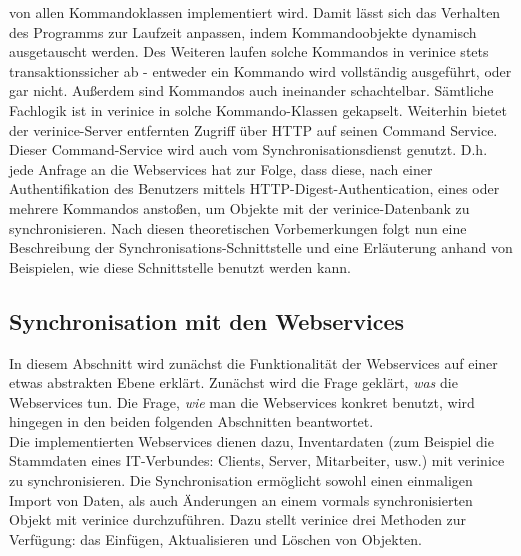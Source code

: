 \documentclass[a4paper,10pt]{book}
\begin{document}
von allen Kommandoklassen implementiert wird. Damit lässt sich das Verhalten des Programms zur
Laufzeit anpassen, indem Kommandoobjekte dynamisch ausgetauscht werden.
\newline
Des Weiteren laufen solche Kommandos in verinice stets transaktionssicher ab - entweder ein Kommando
wird vollständig ausgeführt, oder gar nicht. Außerdem sind Kommandos auch ineinander schachtelbar.
Sämtliche Fachlogik ist in verinice in solche Kommando-Klassen gekapselt. Weiterhin bietet der
verinice-Server entfernten Zugriff über HTTP auf seinen Command Service.
\newline
Dieser Command-Service wird auch vom Synchronisationsdienst genutzt. D.h. jede Anfrage an die Webservices hat zur Folge,
dass diese, nach einer Authentifikation des Benutzers mittels HTTP-Digest-Authentication, eines oder mehrere Kommandos anstoßen,
um Objekte mit der verinice-Datenbank zu synchronisieren.
\newline
Nach diesen theoretischen Vorbemerkungen folgt nun eine Beschreibung der Synchronisations-Schnittstelle
und eine Erläuterung anhand von Beispielen, wie diese Schnittstelle benutzt werden kann.

\subsection{Synchronisation mit den Webservices}
In diesem Abschnitt wird zunächst die Funktionalität der Webservices auf einer etwas abstrakten Ebene
erklärt. Zunächst wird die Frage geklärt, \textit{was} die Webservices tun. Die Frage, \textit{wie}
man die Webservices konkret benutzt, wird hingegen in den beiden folgenden Abschnitten beantwortet.
\newline\\
Die implementierten Webservices dienen dazu, Inventardaten (zum Beispiel die Stammdaten eines IT-Verbundes: Clients, Server, Mitarbeiter, usw.)
mit verinice zu synchronisieren. Die Synchronisation ermöglicht sowohl einen einmaligen Import von Daten, als auch Änderungen
an einem vormals synchronisierten Objekt mit verinice
durchzuführen. Dazu stellt verinice drei Methoden zur Verfügung: das Einfügen, Aktualisieren und Löschen von Objekten.
\end{document}
